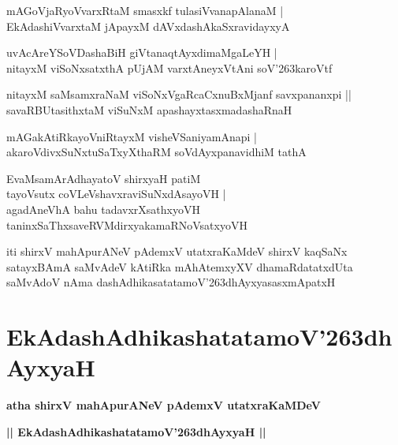 \documentclass[twoside,12pt,openright]{book}
\def\S{\char'263}
\newcounter{shloka}[chapter]
\begin{document}
\begin{shloka}%
mAGoVjaRyoVvarxRtaM smasxkf tulasiVvanapAlanaM |\\
EkAdashiVvarxtaM jApayxM dAVxdashAkaSxravidayxyA 
\end{shloka}

\begin{shloka}%
uvAcAreYSoVDashaBiH giVtanaqtAyxdimaMgaLeYH |\\
nitayxM viSoNxsatxthA pUjAM varxtAneyxVtAni soV\S karoVtf
\end{shloka}

\begin{shloka}%
nitayxM saMsamxraNaM viSoNxVgaRcaCxnuBxMjanf savxpananxpi ||\\
savaRBUtasithxtaM viSuNxM apashayxtasxmadashaRnaH
\end{shloka}

\begin{shloka}%
mAGakAtiRkayoVniRtayxM visheVSaniyamAnapi |\\
akaroVdivxSuNxtuSaTxyXthaRM soVdAyxpanavidhiM tathA 
\end{shloka}

\begin{shloka}%
EvaMsamArAdhayatoV shirxyaH patiM \\
tayoVsutx coVLeVshavxraviSuNxdAsayoVH |\\
agadAneVhA bahu tadavxrXsathxyoVH \\
taninxSaThxsaveRVMdirxyakamaRNoVsatxyoVH
\end{shloka}

\begin{center}
iti shirxV mahApurANeV pAdemxV utatxraKaMdeV shirxV kaqSaNx satayxBAmA saMvAdeV kAtiRka 
mAhAtemxyXV dhamaRdatatxdUta saMvAdoV nAma dashAdhikasatatamoV\S dhAyxyasasxmApatxH 
\end{center}

\chapter{EkAdashAdhikashatatamoV\S dhAyxyaH}

\begin{center}
{\LARGE\bfseries atha shirxV mahApurANeV pAdemxV utatxraKaMDeV}
\end{center}

\begin{center}
{\LARGE\bfseries || EkAdashAdhikashatatamoV\S dhAyxyaH || }
\end{center}
\end{document}
